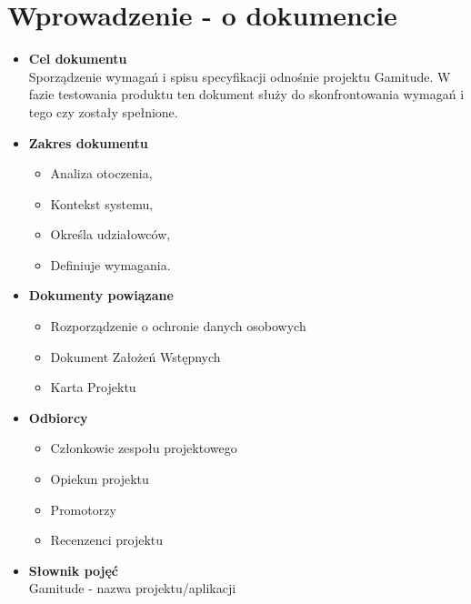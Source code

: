 \documentclass[a4paper,11pt]{report}
\begin{document}
\section{Wprowadzenie - o dokumencie}
\begin{itemize}
	\item \textbf{Cel dokumentu}\\
	Sporządzenie wymagań i spisu specyfikacji odnośnie projektu		 Gamitude. W fazie testowania produktu ten dokument służy do skonfrontowania wymagań i tego czy zostały spełnione.
	\item \textbf{Zakres dokumentu}
	\begin{itemize}
		\item Analiza otoczenia,
		\item Kontekst systemu,
		\item Określa udziałowców,
		\item Definiuje wymagania.
	\end{itemize}
	\item \textbf{Dokumenty powiązane}
	\begin{itemize}
		\item Rozporządzenie o ochronie danych osobowych
		\item Dokument Założeń Wstępnych
		\item Karta Projektu
	\end{itemize}
	\item \textbf{Odbiorcy}
	\begin{itemize}
		\item Członkowie zespołu projektowego
		\item Opiekun projektu
		\item Promotorzy
		\item Recenzenci projektu
	\end{itemize}
	\item \textbf{Słownik pojęć}\\
	Gamitude - nazwa projektu/aplikacji
\end{itemize}
\end{document}
